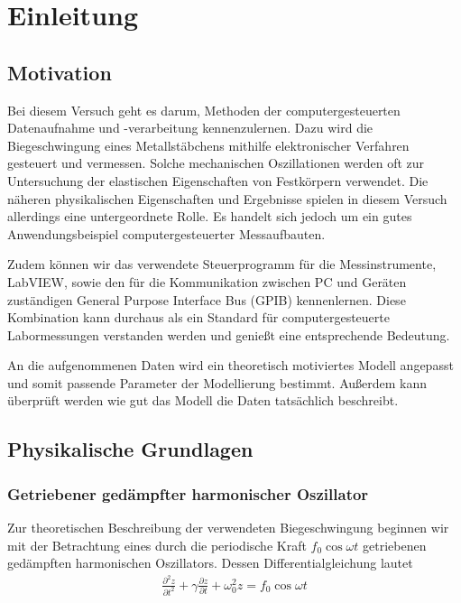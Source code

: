 \section{Einleitung}

\subsection{Motivation}

Bei diesem Versuch geht es darum, Methoden der computergesteuerten Datenaufnahme und -verarbeitung kennenzulernen.
Dazu wird die Biegeschwingung eines Metallstäbchens mithilfe elektronischer Verfahren gesteuert und vermessen.
Solche mechanischen Oszillationen werden oft zur Untersuchung der elastischen Eigenschaften von Festkörpern verwendet.
Die näheren physikalischen Eigenschaften und Ergebnisse spielen in diesem Versuch allerdings eine untergeordnete Rolle.
Es handelt sich jedoch um ein gutes Anwendungsbeispiel computergesteuerter Messaufbauten.

Zudem können wir das verwendete Steuerprogramm für die Messinstrumente, LabVIEW, sowie den für die Kommunikation zwischen PC und Geräten zuständigen General Purpose Interface Bus (GPIB) kennenlernen.
Diese Kombination kann durchaus als ein Standard für computergesteuerte Labormessungen verstanden werden und genießt eine entsprechende Bedeutung.

An die aufgenommenen Daten wird ein theoretisch motiviertes Modell angepasst und somit passende Parameter der Modellierung bestimmt.
Außerdem kann überprüft werden wie gut das Modell die Daten tatsächlich beschreibt.

\subsection{Physikalische Grundlagen}

\subsubsection*{Getriebener gedämpfter harmonischer Oszillator}

Zur theoretischen Beschreibung der verwendeten Biegeschwingung beginnen wir mit der Betrachtung eines durch die periodische Kraft $f_0 \cos \omega t$ getriebenen gedämpften harmonischen Oszillators.
Dessen Differentialgleichung lautet
\begin{align}
\frac{\partial^2 z}{\partial t^2} + \gamma \frac{\partial z}{\partial t} + \omega_0^2 z = f_0 \cos \omega t
\end{align}

